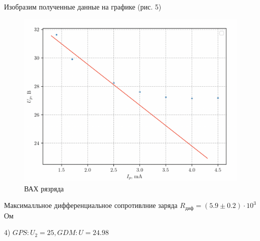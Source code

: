 \documentclass[12pt,a4paper]{article}
\begin{document}
Изобразим полученные данные на графике (рис. 5)
\begin{figure}[H!]
    \centering
    \includegraphics[width=0.6\linewidth]{1graph.png}
    \caption{ВАХ рязряда}
\end{figure}
Максималльное дифференциальное сопротивлние заряда $R_{диф} = (5.9 \pm 0.2) \cdot 10^3$ Ом 
 
4) $GPS :U_2=25, GDM: U=24.98$
\end{document}
